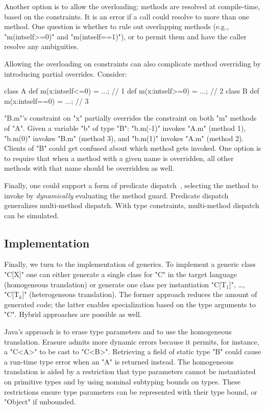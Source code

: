 Another option is to allow the
overloading: methods are resolved at compile-time, based on the
constraints.  It is an error if a call could resolve to more
than one method.  One question is whether to rule out overlapping
methods (e.g., \xcd"m(int{self>=0})" and \xcd"m(int{self==1})"),
or to permit them and have the caller resolve any
ambiguities.


Allowing the overloading on constraints can also complicate method
overriding by introducing partial overrides.
Consider:
\begin{xtennoindent}
  class A {
    def m(x:int{self<=0}) = ...; // 1
    def m(x:int{self>=0}) = ...; // 2
  }
  class B {
    def m(x:int{self==0}) = ...; // 3
  }
\end{xtennoindent}
\noindent
\xcd"B.m"'s constraint on \xcd"x" partially overrides the
constraint on both \xcd"m" methods of \xcd"A".  Given a variable
\xcd"b" of type \xcd"B": \xcd"b.m(-1)" invokes \xcd"A.m" (method 1),
\xcd"b.m(0)" invokes \xcd"B.m" (method 3), and \xcd"b.m(1)"
invokes \xcd"A.m" (method 2).  Clients of \xcd"B" could get
confused about which method gets invoked.  One option is to
require that when a method with a given name is overridden, all
other methods with that name should be overridden as well.

Finally, one could support a form of predicate
dispatch~\cite{jpred}, selecting the method to invoke by
\emph{dynamically} evaluating the method guard.  Predicate
dispatch generalizes multi-method dispatch.  With type
constraints, multi-method dispatch can be simulated.

\subsection{Implementation}

Finally, we turn to the implementation of generics.
To implement a generic class \xcd"C[X]" one can either generate a single 
class for \xcd"C" in the target language (homogeneous translation)
or generate one class per instantiation
\xcdmath"C[T$_1$]", \dots,
\xcdmath"C[T$_k$]" (heterogeneous translation).
The former approach reduces the amount of generated code; the
latter enables specialization based on the type arguments to
\xcd"C".  Hybrid approaches are possible as well.

Java's approach is to erase type parameters and to use the homogeneous
translation.  Erasure admits more dynamic errors because
it permits, for instance, a \xcd"C<A>" to be cast to \xcd"C<B>".
Retrieving a field of static type \xcd"B" could cause a run-time
type error when an \xcd"A" is returned instead.
The homogeneous translation is aided by a restriction that type
parameters cannot be instantiated on primitive types and by
using nominal subtyping bounds on types.
These restrictions ensure type parameters can be represented
with their type bound, or \xcd"Object" if unbounded.

